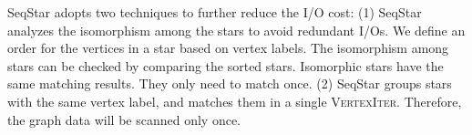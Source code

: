 SeqStar adopts two techniques to further reduce the I/O cost:
(1) SeqStar analyzes the isomorphism among the stars to avoid redundant I/Os.
We define an order for the vertices in a star based on vertex labels. The isomorphism among stars can be checked by comparing the sorted stars.
Isomorphic stars have the same matching results. They only need to match once.
(2) SeqStar groups stars with the same vertex label,
and matches them in a single \textsc{VertexIter}.
Therefore, the graph data will be scanned only once.

